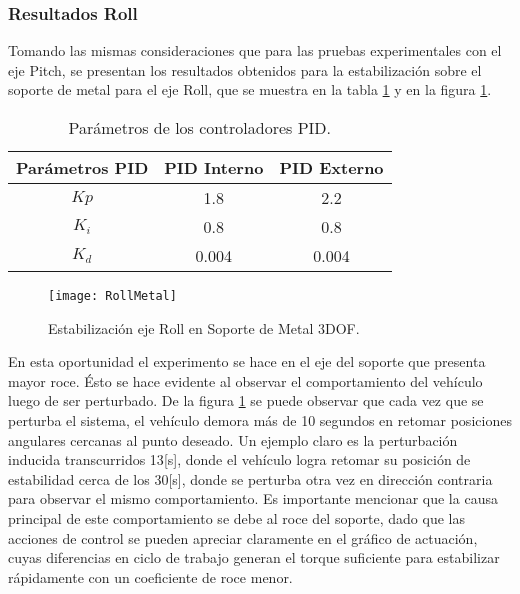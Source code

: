 \documentclass[../main.tex]{subfiles}
\begin{document}
\subsubsection{Resultados Roll}

Tomando las mismas consideraciones que para las pruebas experimentales
con el eje Pitch, se presentan los resultados obtenidos para la estabilización
sobre el soporte de metal para el eje Roll, que se muestra en la tabla \ref{table: Parametros Roll Me} y en la figura \ref{fig:Estabilizacion-eje-Roll}.

\begin{table}[H]
\noindent \begin{centering}
\begin{tabular}{|c|c|c|}
\hline 
Parámetros PID & PID Interno & PID Externo\tabularnewline
\hline 
\hline 
$Kp$ & 1.8 & 2.2\tabularnewline
\hline 
$K_{i}$ & 0.8 & 0.8\tabularnewline
\hline 
$K_{d}$ & 0.004 & 0.004\tabularnewline
\hline 
\end{tabular}
\par\end{centering}
\caption{Parámetros de los controladores PID.}\label{table: Parametros Roll Me}
\end{table}

\begin{figure}[H]
\noindent \begin{centering}
\texttt{[image: RollMetal]}
\par\end{centering}
\caption{Estabilización eje Roll en Soporte de Metal 3DOF.\label{fig:Estabilizacion-eje-Roll}}
\end{figure}

En esta oportunidad el experimento se hace en el eje del soporte que
presenta mayor roce. Ésto se hace evidente al observar el comportamiento
del vehículo luego de ser perturbado. De la figura \ref{fig:Estabilizacion-eje-Roll}
se puede observar que cada vez que se perturba el sistema, el vehículo
demora más de 10 segundos en retomar posiciones angulares cercanas
al punto deseado. Un ejemplo claro es la perturbación inducida transcurridos
13{[}s{]}, donde el vehículo logra retomar su posición de estabilidad
cerca de los 30{[}s{]}, donde se perturba otra vez en dirección contraria
para observar el mismo comportamiento. Es importante mencionar que
la causa principal de este comportamiento se debe al roce del soporte,
dado que las acciones de control se pueden apreciar claramente en
el gráfico de actuación, cuyas diferencias en ciclo de trabajo generan
el torque suficiente para estabilizar rápidamente con un coeficiente
de roce menor.
\end{document}

